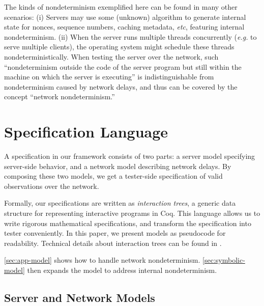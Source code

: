 The kinds of nondeterminism exemplified here can be found in many other
scenarios: (i) Servers may use some (unknown) algorithm to generate internal
state for nonces, sequence numbers, caching metadata, {\it etc}, featuring
internal nondeterminism.  (ii) When the server runs multiple threads
concurrently ({\it e.g.} to serve multiple clients), the operating system might
schedule these threads nondeterministically.  When testing the server over the
network, such ``nondeterminism outside the code of the server program but still
within the machine on which the server is executing'' is indistinguishable from
nondeterminism caused by network delays, and thus can be covered by the concept
``network nondeterminism.''


\section{Specification Language}
\label{sec:spec-language}
A specification in our framework consists of two parts: a server model
specifying
server-side behavior,
and a network model describing network
delays.  By
composing these two models, we get a tester-side specification of valid
observations over the network.

Formally, our specifications are written as {\em interaction trees}, a generic
data structure for representing interactive programs in Coq.  This language
allows us to write rigorous mathematical specifications, and transform the
specification into tester conveniently.  In this
paper, we present models as pseudocode for readability.  Technical details
about interaction trees can be found in \cite{itree}.

\autoref{sec:app-model} shows how to handle network nondeterminism.
\autoref{sec:symbolic-model} then expands the model to address internal
nondeterminism.

\subsection{Server and Network Models}
\label{sec:app-model}


